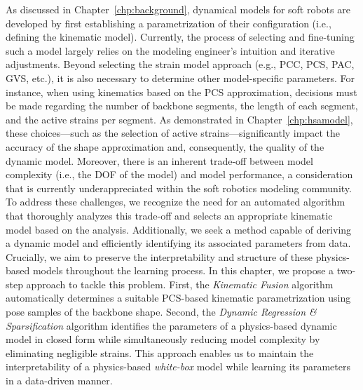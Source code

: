 \begin{foreword}
    As discussed in Chapter~\ref{chp:background}, dynamical models for soft robots are developed by first establishing a parametrization of their configuration (i.e., defining the kinematic model). Currently, the process of selecting and fine-tuning such a model largely relies on the modeling engineer’s intuition and iterative adjustments. Beyond selecting the strain model approach (e.g., \gls{PCC}, \gls{PCS}, \gls{PAC}, \gls{GVS}, etc.), it is also necessary to determine other model-specific parameters. For instance, when using kinematics based on the \gls{PCS} approximation, decisions must be made regarding the number of backbone segments, the length of each segment, and the active strains per segment. As demonstrated in Chapter~\ref{chp:hsamodel}, these choices—such as the selection of active strains—significantly impact the accuracy of the shape approximation and, consequently, the quality of the dynamic model. Moreover, there is an inherent trade-off between model complexity (i.e., the \gls{DOF} of the model) and model performance, a consideration that is currently underappreciated within the soft robotics modeling community.
    To address these challenges, we recognize the need for an automated algorithm that thoroughly analyzes this trade-off and selects an appropriate kinematic model based on the analysis. Additionally, we seek a method capable of deriving a dynamic model and efficiently identifying its associated parameters from data. Crucially, we aim to preserve the interpretability and structure of these physics-based models throughout the learning process.
    In this chapter, we propose a two-step approach to tackle this problem. First, the \emph{Kinematic Fusion} algorithm automatically determines a suitable \gls{PCS}-based kinematic parametrization using pose samples of the backbone shape. Second, the \emph{Dynamic Regression \& Sparsification} algorithm identifies the parameters of a physics-based dynamic model in closed form while simultaneously reducing model complexity by eliminating negligible strains. This approach enables us to maintain the interpretability of a physics-based \emph{white-box} model while learning its parameters in a data-driven manner.
\end{foreword}

\pagebreak

